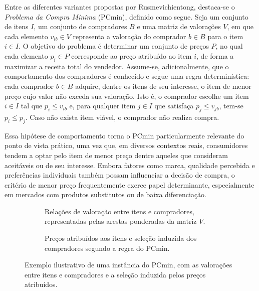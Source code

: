 Entre as diferentes variantes propostas por Rusmevichientong, destaca-se o \textit{Problema da Compra Mínima} (PCmin), definido como segue. Seja um conjunto de itens $I$, um conjunto de compradores $B$ e uma matriz de valorações $V$, em que cada elemento $v_{ib} \in V$ representa a valoração do comprador $b \in B$ para o item $i \in I$. O objetivo do problema é determinar um conjunto de preços $P$, no qual cada elemento $p_i \in P$ corresponde ao preço atribuído ao item $i$, de forma a maximizar a receita total do vendedor. Assume-se, adicionalmente, que o comportamento dos compradores é conhecido e segue uma regra determinística: cada comprador $b \in B$ adquire, dentre os itens de seu interesse, o item de menor preço cujo valor não exceda sua valoração. Isto é, o comprador escolhe um item $i \in I$ tal que $p_i \leq v_{ib}$ e, para qualquer item $j \in I$ que satisfaça $p_j \leq v_{jb}$, tem-se $p_i \leq p_j$. Caso não exista item viável, o comprador não realiza compra.

Essa hipótese de comportamento torna o PCmin particularmente relevante do ponto de vista prático, uma vez que, em diversos contextos reais, consumidores tendem a optar pelo item de menor preço dentre aqueles que consideram aceitáveis ou de seu interesse. Embora fatores como marca, qualidade percebida e preferências individuais também possam influenciar a decisão de compra, o critério de menor preço frequentemente exerce papel determinante, especialmente em mercados com produtos substitutos ou de baixa diferenciação.

\begin{figure}[H]
\centering

\begin{subfigure}[t]{0.45\textwidth}
    \centering
    \conjuntoItensValorados
    \caption{Relações de valoração entre itens e compradores, representadas pelas arestas ponderadas da matriz $V$.}
\end{subfigure}
\hfill
\begin{subfigure}[t]{0.45\textwidth}
    \centering
    \conjuntoItensPrecificados
    \caption{Preços atribuídos aos itens e seleção induzida dos compradores segundo a regra do PCmin.}
\end{subfigure}

\caption{Exemplo ilustrativo de uma instância do PCmin, com as valorações entre itens e compradores e a seleção induzida pelos preços atribuídos.}

\label{fig:exemploPCmin}
\end{figure}

